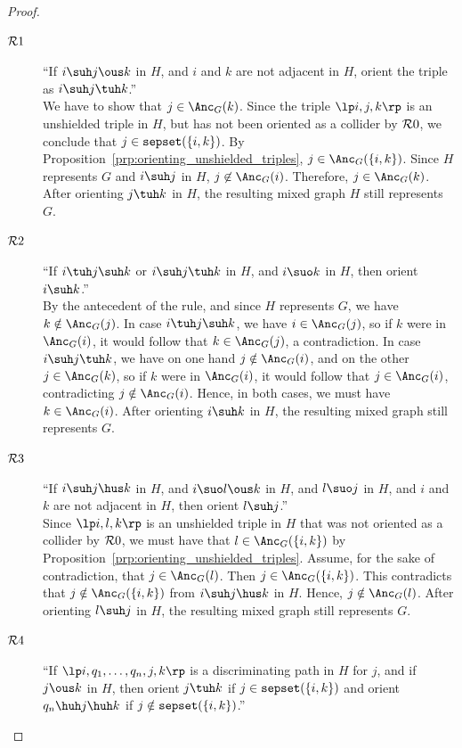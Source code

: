 \begin{proof}
  \begin{description}
    \item[$\mathcal{R}1$] ``If $i \suh j \ous k$ in $H$, and $i$ and $k$ are not adjacent in $H$, orient the triple as $i \suh j \tuh k$.''\\
      We have to show that $j \in \Anc_G(k)$.
      Since the triple $\lt i, j, k \rt$ is an unshielded triple in $H$, but has not been oriented as a collider by $\mathcal{R}0$, we conclude that $j \in \mathtt{sepset}(\{i,k\})$. 
      By Proposition~\ref{prp:orienting_unshielded_triples}, $j \in \Anc_G(\{i,k\})$.
      Since $H$ represents $G$ and $i \suh j$ in $H$, $j \not\in \Anc_G(i)$. 
      Therefore, $j \in \Anc_G(k)$.
      After orienting $j \tuh k$ in $H$, the resulting mixed graph $H$ still represents $G$.
    \item[$\mathcal{R}2$] ``If $i \tuh j \suh k$ or $i \suh j \tuh k$ in $H$, and $i \suo k$ in $H$, then orient $i \suh k$.''\\
      By the antecedent of the rule, and since $H$ represents $G$, we have $k \notin \Anc_G(j)$.
      In case $i \tuh j \suh k$, we have $i \in \Anc_G(j)$, so if $k$ were in $\Anc_G(i)$, it would follow that $k \in \Anc_G(j)$, a contradiction.
      In case $i \suh j \tuh k$, we have on one hand $j \notin \Anc_G(i)$, and on the other $j \in \Anc_G(k)$, so if $k$ were in $\Anc_G(i)$, it would follow that $j \in \Anc_G(i)$, contradicting $j \notin \Anc_G(i)$.
      Hence, in both cases, we must have $k \in \Anc_G(i)$.
      After orienting $i \suh k$ in $H$, the resulting mixed graph still represents $G$.
    \item[$\mathcal{R}3$] ``If $i \suh j \hus k$ in $H$, and $i \suo l \ous k$ in $H$, and $l \suo j$ in $H$, and $i$ and $k$ are not adjacent in $H$, then orient $l \suh j$.''\\
      Since $\lt i, l, k \rt$ is an unshielded triple in $H$ that was not oriented as a collider by $\mathcal{R}0$, we must have that $l \in \Anc_G(\{i,k\})$ by Proposition~\ref{prp:orienting_unshielded_triples}.
      Assume, for the sake of contradiction, that $j \in \Anc_G(l)$. 
      Then $j \in \Anc_G(\{i,k\})$.
      This contradicts that $j \notin \Anc_G(\{i,k\})$ from $i \suh j \hus k$ in $H$.
      Hence, $j \notin \Anc_G(l)$.
      After orienting $l \suh j$ in $H$, the resulting mixed graph still represents $G$.
    \item[$\mathcal{R}4$] ``If $\lt i, q_1, \dots, q_n, j, k \rt$ is a discriminating path in $H$ for $j$, and if $j \ous k$ in $H$, then orient $j \tuh k$ if $j \in \mathtt{sepset}(\{i,k\})$ and orient $q_n \huh j \huh k$ if $j \notin \mathtt{sepset}(\{i,k\})$.''\\

\end{description}
\end{proof}
